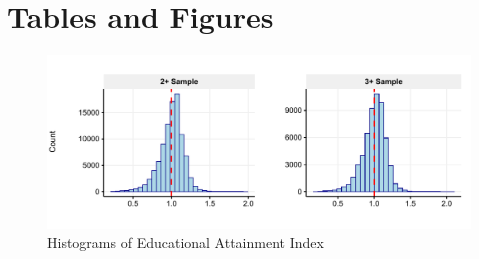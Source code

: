 \documentclass[11pt,a4paper]{article}
\begin{document}


%


\pagebreak


%

\tableofcontents
\pagebreak

\listoffigures

\listoftables
\pagebreak






\printbibliography


\pagebreak
\section*{Tables and Figures}

\begin{figure}[h!]
\centering
\caption{\label{fig:01}Histograms of Educational Attainment Index}
\includegraphics[width=\textwidth]{figures/hists.pdf}
\end{figure}
\end{document}
